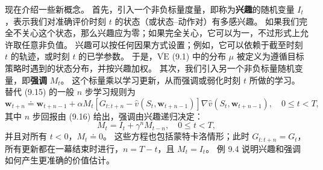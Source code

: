 \documentclass[UTF8,12pt,a4paper,fontset=fandol]{ctexart}
\begin{document}
现在介绍一些新概念。
首先，引入一个非负标量度量，即称为\textbf{兴趣}的随机变量 $I_t$，表示我们对准确评价时刻 $t$ 的状态（或状态--动作对）有多感兴趣。
如果我们完全不关心这个状态，那么兴趣应为零；如果完全关心，它可以为一，不过形式上允许取任意非负值。
兴趣可以按任何因果方式设置；例如，它可以依赖于截至时刻 $t$ 的轨迹，或时刻 $t$ 的已学参数。
于是，$\overline{\mathrm{VE}}$ (9.1) 中的分布 $\mu$ 被定义为遵循目标策略时遇到的状态分布，并按兴趣加权。
其次，我们引入另一个非负标量随机变量，即\textbf{强调} $M_t$。
这个标量乘以学习更新，从而强调或弱化时刻 $t$ 所做的学习。
替代 (9.15) 的一般 $n$ 步学习规则为
\begin{equation}
\mathbf{w}_{t+n}\doteq
\mathbf{w}_{t+n-1}
+\alpha M_t\left[G_{t:t+n}-\hat{v}(S_t,\mathbf{w}_{t+n-1})\right]\nabla\hat{v}(S_t,\mathbf{w}_{t+n-1}),
\quad 0\le t<T,
\tag{9.25}
\end{equation}
其中 $n$ 步回报由 (9.16) 给出，强调由兴趣递归决定：
\begin{equation}
M_t=I_t+\gamma^n M_{t-n},
\quad 0\le t<T,
\tag{9.26}
\end{equation}
并且对所有 $t<0$，$M_t\doteq 0$。
这些方程也包括蒙特卡洛情形；此时 $G_{t:t+n}=G_t$，所有更新都在一幕结束时进行，$n=T-t$，且 $M_t=I_t$。
例 9.4 说明兴趣和强调如何产生更准确的价值估计。
\end{document}
